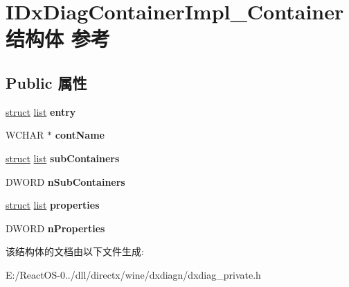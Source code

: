 \hypertarget{struct_i_dx_diag_container_impl___container}{}\section{I\+Dx\+Diag\+Container\+Impl\+\_\+\+Container结构体 参考}
\label{struct_i_dx_diag_container_impl___container}
\subsection*{Public 属性}
\begin{DoxyCompactItemize}
\item 
\mbox{\label{struct_i_dx_diag_container_impl___container_a71ee982b131412f853c82b4fbd48e9cd}} 
\hyperlink{interfacestruct}{struct} \hyperlink{classlist}{list} {\bfseries entry}
\item 
\mbox{\label{struct_i_dx_diag_container_impl___container_a49ed2d40fe2cb6f414362b1b7fd19f5b}} 
W\+C\+H\+AR $\ast$ {\bfseries cont\+Name}
\item 
\mbox{\label{struct_i_dx_diag_container_impl___container_ac0ff37e2c4168cf2aeb3562252ac893a}} 
\hyperlink{interfacestruct}{struct} \hyperlink{classlist}{list} {\bfseries sub\+Containers}
\item 
\mbox{\label{struct_i_dx_diag_container_impl___container_ad49673c0727ec045d66117620fbadff7}} 
D\+W\+O\+RD {\bfseries n\+Sub\+Containers}
\item 
\mbox{\label{struct_i_dx_diag_container_impl___container_a654fbedb021760213eec48fb4c2a0a91}} 
\hyperlink{interfacestruct}{struct} \hyperlink{classlist}{list} {\bfseries properties}
\item 
\mbox{\label{struct_i_dx_diag_container_impl___container_a6408db1aa7226abaed5bce3c302cbead}} 
D\+W\+O\+RD {\bfseries n\+Properties}
\end{DoxyCompactItemize}


该结构体的文档由以下文件生成\+:\begin{DoxyCompactItemize}
\item 
E\+:/\+React\+O\+S-\/0../dll/directx/wine/dxdiagn/dxdiag\+\_\+private.\+h\end{DoxyCompactItemize}
